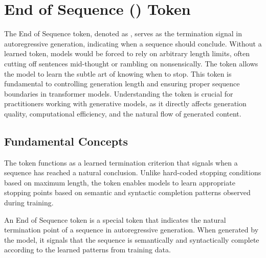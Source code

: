 
\section{End of Sequence (\eos{}) Token}

The End of Sequence token, denoted as \eos{}, serves as the termination signal in autoregressive generation, indicating when a sequence should conclude. Without a learned \eos{} token, models would be forced to rely on arbitrary length limits, often cutting off sentences mid-thought or rambling on nonsensically. The \eos{} token allows the model to learn the subtle art of knowing when to stop. This token is fundamental to controlling generation length and ensuring proper sequence boundaries in transformer models. Understanding the \eos{} token is crucial for practitioners working with generative models, as it directly affects generation quality, computational efficiency, and the natural flow of generated content.
\begin{comment}
Feedback: This is a clear opening. To immediately highlight its importance, you could contrast it with the alternative. For example: "Without a learned [EOS] token, models would be forced to rely on arbitrary length limits, often cutting off sentences mid-thought or rambling on nonsensically. The [EOS] token allows the model to learn the subtle art of knowing when to stop."

STATUS: addressed - added contrast showing problems without EOS tokens and benefits of learned termination
\end{comment}

\subsection{Fundamental Concepts}

The \eos{} token functions as a learned termination criterion that signals when a sequence has reached a natural conclusion. Unlike hard-coded stopping conditions based on maximum length, the \eos{} token enables models to learn appropriate stopping points based on semantic and syntactic completion patterns observed during training.

\begin{definition}
An End of Sequence token \eos{} is a special token that indicates the natural termination point of a sequence in autoregressive generation. When generated by the model, it signals that the sequence is semantically and syntactically complete according to the learned patterns from training data.
\end{definition}

